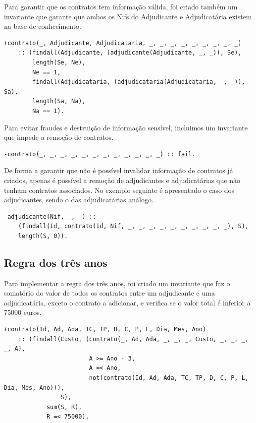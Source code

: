 \documentclass[a4paper]{report}
\begin{document}
Para garantir que os contratos tem informação válida, foi criado também um
invariante que garante que ambos os Nifs do Adjudicante e Adjudicatária existem
na base de conhecimento.

\begin{verbatim}
+contrato(_, Adjudicante, Adjudicataria, _, _, _, _, _, _, _, _, _) 
    :: (findall(Adjudicante, (adjudicante(Adjudicante, _, _)), Se),
        length(Se, Ne),
        Ne == 1,
        findall(Adjudicataria, (adjudicataria(Adjudicataria, _, _)), Sa),
        length(Sa, Na),
        Na == 1).
\end{verbatim}

Para evitar fraudes e destruição de informação sensível, incluimos um invariante
que impede a remoção de contratos.

\begin{verbatim}
-contrato(_, _, _, _, _, _, _, _, _, _, _, _) :: fail.
\end{verbatim}

De forma a garantir que não é possível invalidar informação de contratos já
criados, apenas é possível a remoção de adjudicantes e adjudicatárias que não
tenham contratos associados. No exemplo seguinte é apresentado o caso dos
adjudicantes, sendo o das adjudicatárias análogo.

\begin{verbatim}
-adjudicante(Nif, _, _) :: 
    (findall(Id, contrato(Id, Nif, _, _, _, _, _, _, _, _, _, _), S), 
    length(S, 0)).
\end{verbatim}

\subsection{Regra dos três anos}

Para implementar a regra dos três anos, foi criado um invariante que faz o
somatório do valor de todos os contratos entre um adjudicante e uma
adjudicatária, exceto o contrato a adicionar, e verifica se o valor total é
inferior a 75000 euros.

\begin{verbatim}
+contrato(Id, Ad, Ada, TC, TP, D, C, P, L, Dia, Mes, Ano) 
    :: (findall(Custo, (contrato(_, Ad, Ada, _, _, _, Custo, _, _, _, _, A),
                        A >= Ano - 3,
                        A =< Ano,
                        not(contrato(Id, Ad, Ada, TC, TP, D, C, P, L, Dia, Mes, Ano))),
                S),
            sum(S, R),
            R =< 75000).

\end{verbatim}
\end{document}
